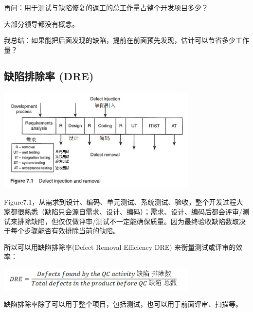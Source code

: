 再问：用于测试与缺陷修复的返工的总工作量占整个开发项目多少？

大部分领导都没有概念。

我总结：如果能把后面发现的缺陷，提前在前面预先发现，估计可以节省多少工作量？


\hypertarget{ux7f3aux9677ux6392ux9664ux7387-dre}{%
\subsection{缺陷排除率 (DRE)}\label{ux7f3aux9677ux6392ux9664ux7387-dre}}


\includegraphics[width=10cm]{jaloteemm7110.png}

Figure7.1，从需求到设计、编码、单元测试、系统测试、验收，整个开发过程大家都很熟悉（缺陷只会源自需求、设计、编码）；需求、设计、编码后都会评审/测试来排除缺陷，但仅仅做评审/测试不一定能确保质量。因为最终验收缺陷数取决于每个步骤能否有效排除当前的缺陷。

所以可以用缺陷排除率(Defect Removal Efficiency DRE)
来衡量测试或评审的效率：


\includegraphics[width=10cm]{Ma310.png}

缺陷排除率除了可以用于整个项目，包括测试，也可以用于前面评审、扫描等。

\begin{description}
\item[]
\begin{description}
\tightlist
\item[]
= = =
\end{description}
\end{description}

